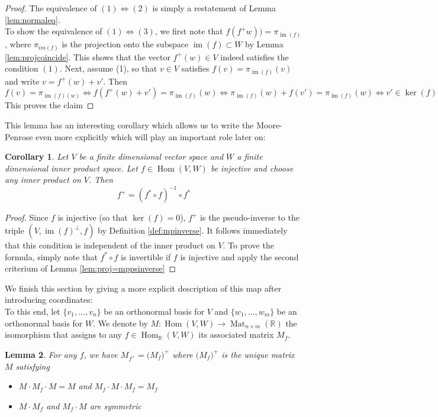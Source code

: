 \documentclass{book}
\theoremstyle{plain}
\newtheorem{corollary}{Corollary}[section]
\newtheorem{lemma}[corollary]{Lemma}
\theoremstyle{definition}
\renewcommand{\d}[1]{\mathbb{#1}}
\DeclareMathOperator{\Hom}{Hom}
\DeclareMathOperator{\im}{im}
\DeclareMathOperator{\Mat}{Mat}
\newcommand{\mor}{\longrightarrow}
\begin{document}
\begin{proof}
	The equivalence of $(1)\iff (2)$ is simply a restatement of Lemma \ref{lem:normaleq}.\\
	To show the equivalence of $(1)\iff (3)$, we first note that $f(f^+w))=\pi_{\im(f)}$, where $\pi_{im(f)}$ is the projection onto the subspace $\im(f)\subset W$ by Lemma \ref{lem:projcoincide}. This shows that the vector $f^+(w) \in V$ indeed satisfies the condition $(1)$. Next, assume (1), so that $v \in V$ satisfies $f(v)=\pi_{\im(f)}(v)$ and write $v= f^+(w)+v'$. Then\[
	f(v)=\pi_{\im(f)(w)}\iff f(f^+(w)+v')=\pi_{\im(f)}(w)\iff \pi_{\im(f)}(w)+f(v')=\pi_{\im(f)}(w)\iff v'\in \ker(f)
	\]
	This proves the claim
\end{proof}

This lemma has an interesting corollary which allows us to write the Moore-Penrose even more explicitly which will play an important role later on:

\begin{corollary}\label{cor:psinverse-injective}
Let $V$ be a finite dimensional vector space and $W$ a finite dimensional inner product space. Let $f \in \Hom(V,W)$ be injective and choose \emph{any} inner product on $V$. Then
\[
f^+ = (f^*\circ f)^{-1}\circ f^*
\] 
\end{corollary}

\begin{proof}
	Since $f$ is injective (so that $\ker(f)=0$), $f^+$ is the pseudo-inverse to the triple $(V,\im(f)^{\perp},f)$ by Definition \ref{def:mpinverse}. It follows immediately that this condition is independent of the inner product on $V$. To prove the formula, simply note that $f^*\circ f$ is invertible if $f$ is injective and apply the second criterium of Lemma \ref{lem:proj=mppsinverse}
\end{proof}


\noindent We finish this section by giving a more explicit description of this map after introducing coordinates:\\
To this end, let $\big\{v_1,\ldots ,v_n \big\}$ be an orthonormal basis for $V$ and $\big\{w_1,\ldots, w_m\big\}$ be an orthonormal basis for $W$. We denote by $M: \Hom(V,W)\mor \Mat_{n\times m}(\d{R})$ the isomorphism that assigns to any $f \in \Hom_\d{R}(V,W)$ its associated matrix $M_f$.

\begin{lemma}\label{lem:mppscoordinates}
	For any $f$, we have $M_{f^+}=\big( M_f\big)^+$ where $ \big(M_f\big)^+$ is the unique matrix $M$ satisfying
	\begin{itemize}
		\item $M\cdot M_f \cdot M=M$ and $M_f \cdot M \cdot M_f=M_f$
		\item $M\cdot M_f$ and $M_f \cdot M$ are symmetric
	\end{itemize}
\end{lemma}
\end{document}
